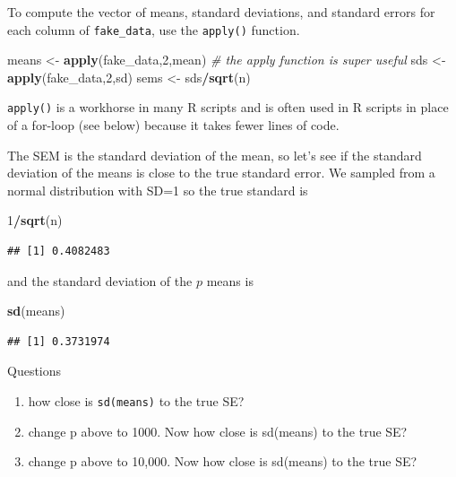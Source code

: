 \documentclass[]{book}
\newenvironment{Shaded}{\begin{snugshade}}{\end{snugshade}}
\newcommand{\CommentTok}[1]{\textcolor[rgb]{0.56,0.35,0.01}{\textit{#1}}}
\newcommand{\DecValTok}[1]{\textcolor[rgb]{0.00,0.00,0.81}{#1}}
\newcommand{\KeywordTok}[1]{\textcolor[rgb]{0.13,0.29,0.53}{\textbf{#1}}}
\newcommand{\NormalTok}[1]{#1}
\newcommand{\OperatorTok}[1]{\textcolor[rgb]{0.81,0.36,0.00}{\textbf{#1}}}
\newcommand{\StringTok}[1]{\textcolor[rgb]{0.31,0.60,0.02}{#1}}
\providecommand{\tightlist}{%
  \setlength{\itemsep}{0pt}\setlength{\parskip}{0pt}}
\begin{document}
To compute the vector of means, standard deviations, and standard errors for each column of \texttt{fake\_data}, use the \texttt{apply()} function.

\begin{Shaded}
\begin{Highlighting}[]
\NormalTok{means <-}\StringTok{ }\KeywordTok{apply}\NormalTok{(fake_data,}\DecValTok{2}\NormalTok{,mean) }\CommentTok{# the apply function is super useful}
\NormalTok{sds <-}\StringTok{ }\KeywordTok{apply}\NormalTok{(fake_data,}\DecValTok{2}\NormalTok{,sd)}
\NormalTok{sems <-}\StringTok{ }\NormalTok{sds}\OperatorTok{/}\KeywordTok{sqrt}\NormalTok{(n)}
\end{Highlighting}
\end{Shaded}

\texttt{apply()} is a workhorse in many R scripts and is often used in R scripts in place of a for-loop (see below) because it takes fewer lines of code.

The SEM is the standard deviation of the mean, so let's see if the standard deviation of the means is close to the true standard error. We sampled from a normal distribution with SD=1 so the true standard is

\begin{Shaded}
\begin{Highlighting}[]
\DecValTok{1}\OperatorTok{/}\KeywordTok{sqrt}\NormalTok{(n)}
\end{Highlighting}
\end{Shaded}

\begin{verbatim}
## [1] 0.4082483
\end{verbatim}

and the standard deviation of the \(p\) means is

\begin{Shaded}
\begin{Highlighting}[]
\KeywordTok{sd}\NormalTok{(means)}
\end{Highlighting}
\end{Shaded}

\begin{verbatim}
## [1] 0.3731974
\end{verbatim}

Questions

\begin{enumerate}
\def\labelenumi{\arabic{enumi}.}
\tightlist
\item
  how close is \texttt{sd(means)} to the true SE?
\item
  change p above to 1000. Now how close is sd(means) to the true SE?
\item
  change p above to 10,000. Now how close is sd(means) to the true SE?
\end{enumerate}
\end{document}
